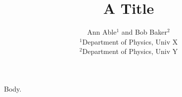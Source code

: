 \documentclass{article}
\newcommand{\affil}[1]{\\{\footnotesize #1}}
\begin{document}
\title{A Title}
\author{Ann Able$^1$ and Bob Baker$^2$
\affil{$^1$Department of Physics, Univ X}
\affil{$^2$Department of Physics, Univ Y}}
\maketitle
Body.
\end{document}
